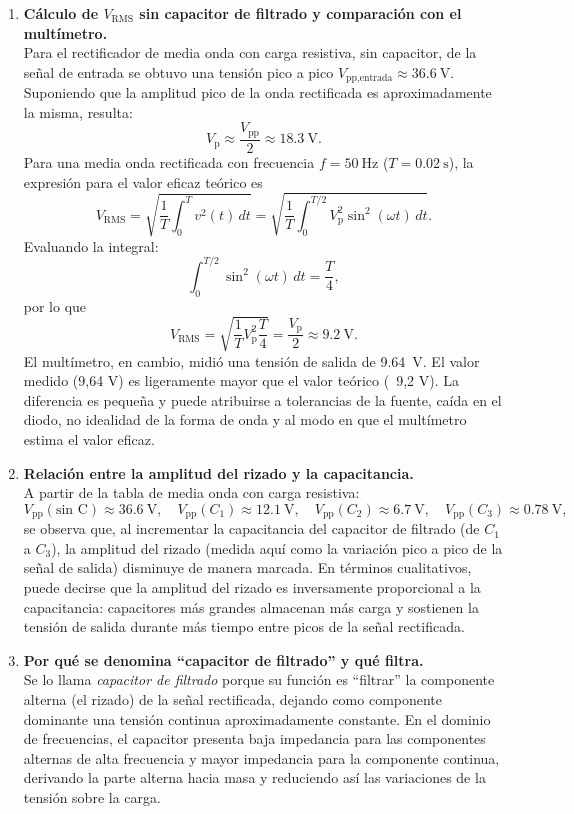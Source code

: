 \documentclass[a4paper,12pt]{article}
\begin{document}
\begin{enumerate}
    \item \textbf{Cálculo de \(V_{\text{RMS}}\) sin capacitor de filtrado y comparación con el multímetro.}\\[4pt]
    Para el rectificador de media onda con carga resistiva, sin capacitor, de la señal de entrada se obtuvo una tensión pico a pico \(V_{\text{pp,entrada}} \approx \SI{36,6}{\volt}\). Suponiendo que la amplitud pico de la onda rectificada es aproximadamente la misma, resulta:
    \[
        V_{\text{p}} \approx \frac{V_{\text{pp}}}{2} \approx \SI{18,3}{\volt}.
    \]
    Para una media onda rectificada con frecuencia \(f = \SI{50}{\hertz}\) (\(T = \SI{0,02}{\second}\)), la expresión para el valor eficaz teórico es
    \[
        V_{\text{RMS}} = \sqrt{\frac{1}{T}\int_0^{T} v^2(t)\, dt}
                      = \sqrt{\frac{1}{T}\int_0^{T/2} V_{\text{p}}^{2} \sin^{2}(\omega t)\, dt}.
    \]
    Evaluando la integral:
    \[
        \int_0^{T/2} \sin^{2}(\omega t)\, dt = \frac{T}{4},
    \]
    por lo que
    \[
        V_{\text{RMS}} = \sqrt{\frac{1}{T} V_{\text{p}}^{2} \frac{T}{4}} = \frac{V_{\text{p}}}{2}
        \approx \SI{9,2}{\volt}.
    \]
    El multímetro, en cambio, midió una tensión de salida de \SI{9,64}{\volt}. El valor medido (9,64 V) es ligeramente mayor que el valor teórico (~9,2 V). La diferencia es pequeña y puede atribuirse a tolerancias de la fuente, caída en el diodo, no idealidad de la forma de onda y al modo en que el multímetro estima el valor eficaz.

    \item \textbf{Relación entre la amplitud del rizado y la capacitancia.}\\[4pt]
    A partir de la tabla de media onda con carga resistiva:
    \[
        V_{\text{pp}}(\text{sin C}) \approx \SI{36,6}{\volt},\quad
        V_{\text{pp}}(C_1) \approx \SI{12,1}{\volt},\quad
        V_{\text{pp}}(C_2) \approx \SI{6,7}{\volt},\quad
        V_{\text{pp}}(C_3) \approx \SI{0,78}{\volt},
    \]
    se observa que, al incrementar la capacitancia del capacitor de filtrado (de \(C_1\) a \(C_3\)), la amplitud del rizado (medida aquí como la variación pico a pico de la señal de salida) disminuye de manera marcada. En términos cualitativos, puede decirse que la amplitud del rizado es inversamente proporcional a la capacitancia: capacitores más grandes almacenan más carga y sostienen la tensión de salida durante más tiempo entre picos de la señal rectificada.

    \item \textbf{Por qué se denomina “capacitor de filtrado” y qué filtra.}\\[4pt]
    Se lo llama \emph{capacitor de filtrado} porque su función es “filtrar” la componente alterna (el rizado) de la señal rectificada, dejando como componente dominante una tensión continua aproximadamente constante. En el dominio de frecuencias, el capacitor presenta baja impedancia para las componentes alternas de alta frecuencia y mayor impedancia para la componente continua, derivando la parte alterna hacia masa y reduciendo así las variaciones de la tensión sobre la carga.


\end{enumerate}
\end{document}
